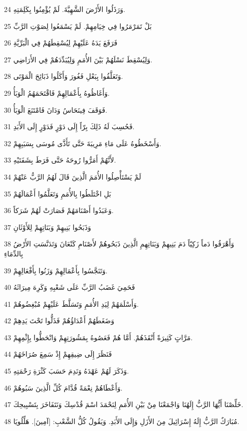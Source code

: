 \par 24 وَرَذَلُوا الأَرْضَ الشَّهِيَّةَ. لَمْ يُؤْمِنُوا بِكَلِمَتِهِ.
\par 25 بَلْ تَمَرْمَرُوا فِي خِيَامِهِمْ. لَمْ يَسْمَعُوا لِصَوْتِ الرَّبِّ
\par 26 فَرَفَعَ يَدَهُ عَلَيْهِمْ لِيُسْقِطَهُمْ فِي الْبَرِّيَّةِ
\par 27 وَلِيُسْقِطَ نَسْلَهُمْ بَيْنَ الأُمَمِ وَلِيُبَدِّدَهُمْ فِي الأَرَاضِي.
\par 28 وَتَعَلَّقُوا بِبَعْلِ فَغُورَ وَأَكَلُوا ذَبَائِحَ الْمَوْتَى.
\par 29 وَأَغَاظُوهُ بِأَعْمَالِهِمْ فَاقْتَحَمَهُمُ الْوَبَأُ.
\par 30 فَوَقَفَ فِينَحَاسُ وَدَانَ فَامْتَنَعَ الْوَبَأُ.
\par 31 فَحُسِبَ لَهُ ذَلِكَ بِرّاً إِلَى دَوْرٍ فَدَوْرٍ إِلَى الأَبَدِ.
\par 32 وَأَسْخَطُوهُ عَلَى مَاءِ مَرِيبَةَ حَتَّى تَأَذَّى مُوسَى بِسَبَبِهِمْ.
\par 33 لأَنَّهُمْ أَمَرُّوا رُوحَهُ حَتَّى فَرَطَ بِشَفَتَيْهِ.
\par 34 لَمْ يَسْتَأْصِلُوا الأُمَمَ الَّذِينَ قَالَ لَهُمُ الرَّبُّ عَنْهُمْ
\par 35 بَلِ اخْتَلَطُوا بِالأُمَمِ وَتَعَلَّمُوا أَعْمَالَهُمْ
\par 36 وَعَبَدُوا أَصْنَامَهُمْ فَصَارَتْ لَهُمْ شَرَكاً.
\par 37 وَذَبَحُوا بَنِيهِمْ وَبَنَاتِهِمْ لِلأَوْثَانِ
\par 38 وَأَهْرَقُوا دَماً زَكِيّاً دَمَ بَنِيهِمْ وَبَنَاتِهِمِ الَّذِينَ ذَبَحُوهُمْ لأَصْنَامِ كَنْعَانَ وَتَدَنَّسَتِ الأَرْضُ بِالدِّمَاءِ
\par 39 وَتَنَجَّسُوا بِأَعْمَالِهِمْ وَزَنُوا بِأَفْعَالِهِمْ.
\par 40 فَحَمِيَ غَضَبُ الرَّبِّ عَلَى شَعْبِهِ وَكَرِهَ مِيرَاثَهُ
\par 41 وَأَسْلَمَهُمْ لِيَدِ الأُمَمِ وَتَسَلَّطَ عَلَيْهِمْ مُبْغِضُوهُمْ.
\par 42 وَضَغَطَهُمْ أَعْدَاؤُهُمْ فَذَلُّوا تَحْتَ يَدِهِمْ
\par 43 مَرَّاتٍ كَثِيرَةً أَنْقَذَهُمْ. أَمَّا هُمْ فَعَصُوهُ بِمَشُورَتِهِمْ وَانْحَطُّوا بِإِثْمِهِمْ.
\par 44 فَنَظَرَ إِلَى ضِيقِهِمْ إِذْ سَمِعَ صُرَاخَهُمْ
\par 45 وَذَكَرَ لَهُمْ عَهْدَهُ وَنَدِمَ حَسَبَ كَثْرَةِ رَحْمَتِهِ.
\par 46 وَأَعْطَاهُمْ نِعْمَةً قُدَّامَ كُلِّ الَّذِينَ سَبُوهُمْ.
\par 47 خَلِّصْنَا أَيُّهَا الرَّبُّ إِلَهُنَا وَاجْمَعْنَا مِنْ بَيْنِ الأُمَمِ لِنَحْمَدَ اسْمَ قُدْسِكَ وَنَتَفَاخَرَ بِتَسْبِيحِكَ.
\par 48 مُبَارَكٌ الرَّبُّ إِلَهُ إِسْرَائِيلَ مِنَ الأَزَلِ وَإِلَى الأَبَدِ. وَيَقُولُ كُلُّ الشَّعْبِ: [آمِينَ]. هَلِّلُويَا.

